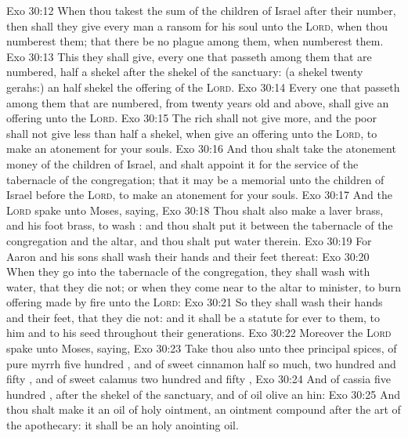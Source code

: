 \vs Exo 30:12 When thou takest the sum of the children of Israel after their number, then shall they give every man a ransom for his soul unto the \textsc{Lord}, when thou numberest them; that there be no plague among them, when  numberest them.
\vs Exo 30:13 This they shall give, every one that passeth among them that are numbered, half a shekel after the shekel of the sanctuary: (a shekel  twenty gerahs:) an half shekel  the offering of the \textsc{Lord}.
\vs Exo 30:14 Every one that passeth among them that are numbered, from twenty years old and above, shall give an offering unto the \textsc{Lord}.
\vs Exo 30:15 The rich shall not give more, and the poor shall not give less than half a shekel, when  give an offering unto the \textsc{Lord}, to make an atonement for your souls.
\vs Exo 30:16 And thou shalt take the atonement money of the children of Israel, and shalt appoint it for the service of the tabernacle of the congregation; that it may be a memorial unto the children of Israel before the \textsc{Lord}, to make an atonement for your souls.
\vs Exo 30:17 And the \textsc{Lord} spake unto Moses, saying,
\vs Exo 30:18 Thou shalt also make a laver  brass, and his foot  brass, to wash : and thou shalt put it between the tabernacle of the congregation and the altar, and thou shalt put water therein.
\vs Exo 30:19 For Aaron and his sons shall wash their hands and their feet thereat:
\vs Exo 30:20 When they go into the tabernacle of the congregation, they shall wash with water, that they die not; or when they come near to the altar to minister, to burn offering made by fire unto the \textsc{Lord}:
\vs Exo 30:21 So they shall wash their hands and their feet, that they die not: and it shall be a statute for ever to them,  to him and to his seed throughout their generations.
\vs Exo 30:22 Moreover the \textsc{Lord} spake unto Moses, saying,
\vs Exo 30:23 Take thou also unto thee principal spices, of pure myrrh five hundred , and of sweet cinnamon half so much,  two hundred and fifty , and of sweet calamus two hundred and fifty ,
\vs Exo 30:24 And of cassia five hundred , after the shekel of the sanctuary, and of oil olive an hin:
\vs Exo 30:25 And thou shalt make it an oil of holy ointment, an ointment compound after the art of the apothecary: it shall be an holy anointing oil.
